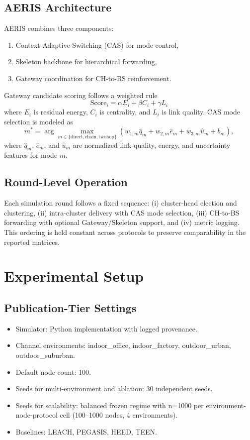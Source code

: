﻿\documentclass[sensors,article,submit,moreauthors,pdftex]{Definitions/mdpi}
\begin{document}
\subsection{AERIS Architecture}
AERIS combines three components:
\begin{enumerate}
\item Context-Adaptive Switching (CAS) for mode control,
\item Skeleton backbone for hierarchical forwarding,
\item Gateway coordination for CH-to-BS reinforcement.
\end{enumerate}
Gateway candidate scoring follows a weighted rule
\begin{equation}
\mathrm{Score}_i = \alpha E_i + \beta C_i + \gamma L_i
\end{equation}
where $E_i$ is residual energy, $C_i$ is centrality, and $L_i$ is link quality.
CAS mode selection is modeled as
\begin{equation}
m^{*}=\arg\max_{m\in\{\mathrm{direct},\mathrm{chain},\mathrm{twohop}\}}
\left(w_{1,m}\hat{q}_{m}+w_{2,m}\hat{e}_{m}+w_{3,m}\hat{u}_{m}+b_m\right),
\end{equation}
where $\hat{q}_{m}$, $\hat{e}_{m}$, and $\hat{u}_{m}$ are normalized link-quality, energy, and uncertainty features for mode $m$.

\subsection{Round-Level Operation}
Each simulation round follows a fixed sequence: (i) cluster-head election and clustering, (ii) intra-cluster delivery with CAS mode selection, (iii) CH-to-BS forwarding with optional Gateway/Skeleton support, and (iv) metric logging. This ordering is held constant across protocols to preserve comparability in the reported matrices.

\section{Experimental Setup}
\subsection{Publication-Tier Settings}
\begin{itemize}
\item Simulator: Python implementation with logged provenance.
\item Channel environments: indoor\_office, indoor\_factory, outdoor\_urban, outdoor\_suburban.
\item Default node count: 100.
\item Seeds for multi-environment and ablation: 30 independent seeds.
\item Seeds for scalability: balanced frozen regime with n=1000 per environment-node-protocol cell (100--1000 nodes, 4 environments).
\item Baselines: LEACH, PEGASIS, HEED, TEEN.
\end{itemize}
\end{document}
